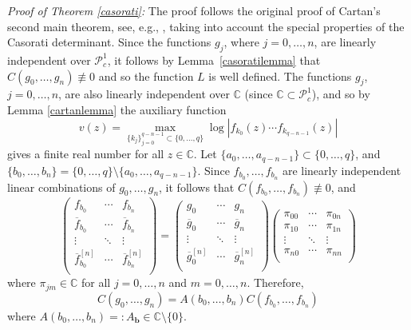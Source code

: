 \documentclass{amsart}
\newcommand{\C}{\mathbb{C}}
\theoremstyle{definition}
\numberwithin{equation}{section}
\numberwithin{theorem}{section}
\begin{document}
\noindent\textit{Proof of Theorem \ref{casorati}: } The proof
follows the original proof of Cartan's second main theorem, see,
e.g., \cite{cartan:33,hayman:84,gundersenh:04}, taking into
account the special properties of the Casorati determinant. Since
the functions $g_j$, where $j=0,\ldots,n$, are linearly independent over $\mathcal{P}^1_c$, it follows by Lemma~\ref{casoratilemma} that $C(g_0,\ldots,g_n)\not\equiv0$ and so the function $L$ is well defined. The functions $g_j$, $j=0,\ldots,n$, are also linearly independent over $\C$ (since $\C\subset\mathcal{P}^1_c$), and so by Lemma \ref{cartanlemma} the auxiliary
function
    \begin{equation}\label{v}
    v(z)=\max_{\{k_j\}_{j=0}^{q-n-1}\subset\{0,\ldots,q\}}\log|f_{k_0}(z)\cdots f_{k_{q-n-1}}(z)|
    \end{equation}
gives a finite real number for all $z\in\C$. Let
$\{a_0,\ldots,a_{q-n-1}\}\subset \{0,\ldots,q\}$, and
$\{b_0,\ldots,b_n\}=\{0,\ldots,q\}\setminus
\{a_0,\ldots,a_{q-n-1}\}$. Since $f_{b_0},\ldots,f_{b_n}$ are
linearly independent linear combinations of $g_0,\ldots,g_n$, it follows that
$C(f_{b_0},\ldots,f_{b_n})\not\equiv0$, and
    \begin{equation*}
    \left(\begin{array}{cccc}
      f_{b_0} & \cdots & f_{b_n} \\
      \overline{f}_{b_0}  & \cdots & \overline{f}_{b_n} \\
      \vdots & \ddots & \vdots \\
      \overline{f}^{[n]}_{b_0} &  \cdots & \overline{f}^{[n]}_{b_n} \\
    \end{array}\right)=\left(\begin{array}{cccc}
      g_0 &  \cdots & g_n \\
      \overline{g}_0 & \cdots & \overline{g}_n \\
      \vdots  & \ddots & \vdots \\
      \overline{g}^{[n]}_0 &  \cdots & \overline{g}^{[n]}_n \\
    \end{array}\right)\left(\begin{array}{cccc}
      \pi_{00} &  \cdots & \pi_{0n} \\
      \pi_{10} &  \cdots & \pi_{1n}\\
      \vdots &  \ddots & \vdots \\
      \pi_{n0} &   \cdots & \pi_{nn} \\
    \end{array}\right)
    \end{equation*}
where $\pi_{jm}\in \C$ for all $j=0,\ldots,n$ and $m=0,\ldots,n$.
Therefore,
    \begin{equation}\label{C}
    C(g_0,\ldots,g_n)=A(b_0,\ldots,b_n) C(f_{b_0},\ldots,f_{b_n})
    \end{equation}
where $A(b_0,\ldots,b_n)=:A_\textbf{b}\in \C\setminus\{0\}$.
\end{document}
